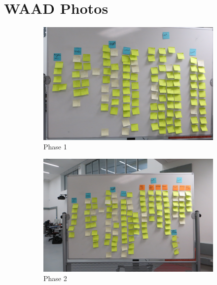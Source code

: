 \documentclass[12pt]{article} %
\begin{document}
\section{WAAD Photos} %
  \begin{figure}[H]
    \begin{subfigure}{.5\linewidth}
      \centering
      \includegraphics[width=0.95\linewidth]{WAAD_version1}
      \caption{Phase 1}
      \label{fig:WAAD_version1}
    \end{subfigure}%
    \begin{subfigure}{.5\linewidth}
      \centering
      \includegraphics[width=0.95\linewidth]{WAAD_version2}
      \caption{Phase 2}
      \label{fig:WAAD_version2}
    \end{subfigure}\\[1ex]
    \begin{subfigure}{.5\linewidth}
      \centering

\end{subfigure}
\end{figure}
\end{document}
